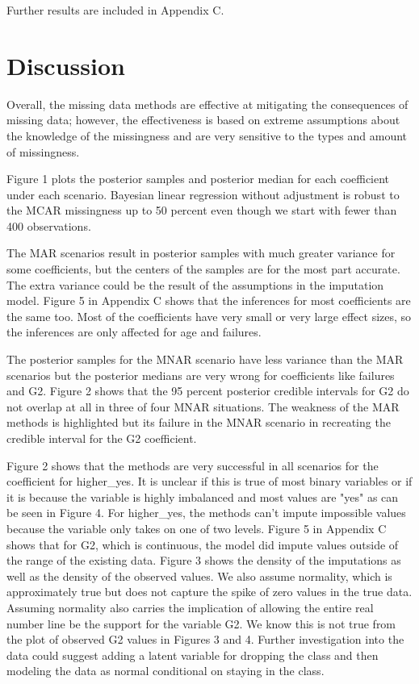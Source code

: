 \documentclass[11pt]{article}
\begin{document}
Further results are included in Appendix C. 

\section{Discussion}

Overall, the missing data methods are effective at mitigating the consequences of missing data; however, the effectiveness is based on extreme assumptions about the knowledge of the missingness and are very sensitive to the types and amount of missingness. 

Figure 1 plots the posterior samples and posterior median for each coefficient under each scenario. Bayesian linear regression without adjustment is robust to the MCAR missingness up to 50 percent even though we start with fewer than 400 observations. 

The MAR scenarios result in posterior samples with much greater variance for some coefficients, but the centers of the samples are for the most part accurate. The extra variance could be the result of the assumptions in the imputation model. Figure 5 in Appendix C shows that the inferences for most coefficients are the same too. Most of the coefficients have very small or very large effect sizes, so the inferences are only affected for age and failures.

The posterior samples for the MNAR scenario have less variance than the MAR scenarios but the posterior medians are very wrong for coefficients like failures and G2. Figure 2 shows that the 95 percent posterior credible intervals for G2 do not overlap at all in three of four MNAR situations. The weakness of the MAR methods is highlighted but its failure in the MNAR scenario in recreating the credible interval for the G2 coefficient.  

Figure 2 shows that the methods are very successful in all scenarios for the coefficient for higher\_yes. It is unclear if this is true of most binary variables or if it is because the variable is highly imbalanced and most values are "yes" as can be seen in Figure 4. For higher\_yes, the methods can't impute impossible values because the variable only takes on one of two levels. Figure 5 in Appendix C shows that for G2, which is continuous, the model did impute values outside of the range of the existing data. Figure 3 shows the density of the imputations as well as the density of the observed values. We also assume normality, which is approximately true but does not capture the spike of zero values in the true data. Assuming normality also carries the implication of allowing the entire real number line be the support for the variable G2. We know this is not true from the plot of observed G2 values in Figures 3 and 4. Further investigation into the data could suggest adding a latent variable for dropping the class and then modeling the data as normal conditional on staying in the class. 
\end{document}
